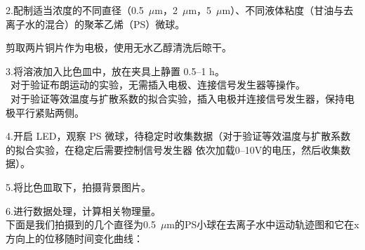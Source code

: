 \documentclass[a4paper]{report} %
\begin{document}
2.配制适当浓度的不同直径（0.5~$\mu$m，2~$\mu$m，5~$\mu$m）、不同液体粘度（甘油与去离子水的混合）的聚苯乙烯（PS）微球。\par
剪取两片铜片作为电极，使用无水乙醇清洗后晾干。\par
3.将溶液加入比色皿中，放在夹具上静置 0.5--1 h。\\ 
\quad \textbullet\ 对于验证布朗运动的实验，无需插入电极、连接信号发生器等操作。 \\
\quad \textbullet\ 对于验证等效温度与扩散系数的拟合实验，插入电极并连接信号发生器，保持电极平行紧贴两侧。\par
4.开启 LED，观察 PS 微球，待稳定时收集数据（对于验证等效温度与扩散系数的拟合实验，在稳定后需要控制信号发生器
依次加载0--10V的电压，然后收集数据）。\par
5.将比色皿取下，拍摄背景图片。\par
6.进行数据处理，计算相关物理量。\\
下面是我们拍摄到的几个直径为0.5~$\mu$m的PS小球在去离子水中运动轨迹图和它在x方向上的位移随时间变化曲线：
\end{document}
